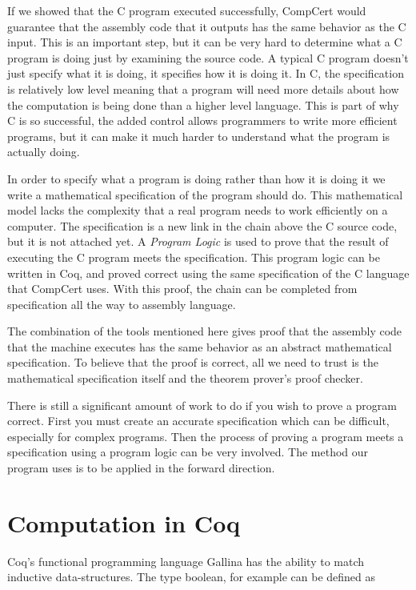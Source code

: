 \documentclass{puthesis}
\begin{document}
If we showed that the C program executed successfully, CompCert would
guarantee that the assembly code that it outputs has the same behavior
as the C input. This is an important step, but it can be very hard to 
determine what a C program is doing just by examining the source code.
A typical C program doesn't just specify what it is doing, it specifies
how it is doing it. In C, the specification is relatively low level
meaning that a program will need more details about how the computation
is being done than a higher level language. This is part of why C is 
so successful, the added control allows programmers to write more efficient
programs, but it can make it much harder to understand what the program
is actually doing.

In order to specify what a program is doing rather than how it is doing
it we write a mathematical specification of the program should do. This
mathematical model lacks the
complexity that a real program needs to work efficiently on a
computer. The specification is a new link in the chain above
the C source code, but it is not attached yet. A 
\emph{Program Logic} is used to prove that the result
of executing the C program meets the specification. This program logic
can be written in Coq, and proved correct using the same specification
of the C language that CompCert uses. With this proof, the chain
can be completed from specification all the way to assembly language.

The combination of the tools mentioned here gives proof that the
assembly code that the machine executes has the same behavior as
an abstract mathematical specification. To believe that the proof is
correct, all we need to trust is the mathematical specification itself
and the theorem prover's proof checker. 

There is still a significant amount of work to do if you wish to prove
a program correct. First you must create an accurate specification which
can be difficult, especially for complex programs. Then the process
of proving a program meets a specification using a program logic can
be very involved. The method our program uses is to be applied in the
forward direction. 


\chapter{Computation in Coq}

Coq's functional programming language Gallina has the ability to match inductive
data-structures. The type boolean, for example can be defined as
\end{document}
